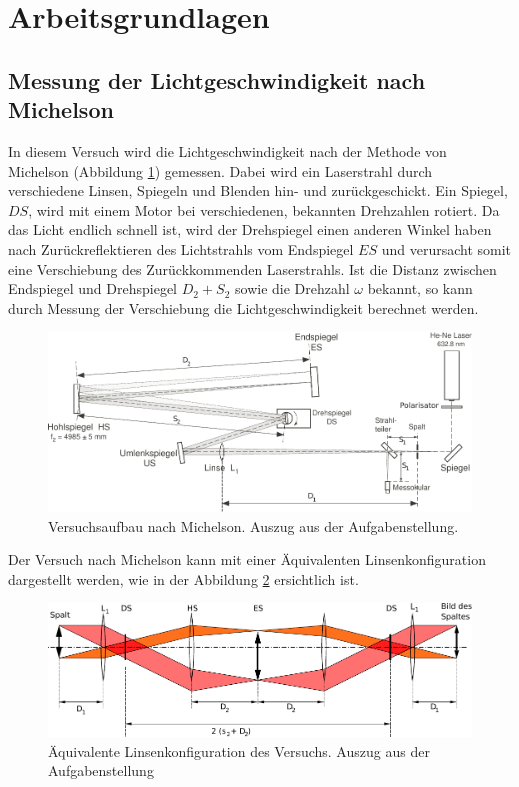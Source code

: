 \section{Arbeitsgrundlagen}

\subsection{Messung der Lichtgeschwindigkeit nach Michelson}

In diesem Versuch wird die  Lichtgeschwindigkeit  nach der Methode von Michelson
(Abbildung  \ref{fig:michelson})  gemessen. Dabei  wird  ein  Laserstrahl  durch
verschiedene  Linsen,  Spiegeln  und Blenden  hin-  und  zur\"uckgeschickt.  Ein
Spiegel,  $DS$, wird mit einem Motor  bei  verschiedenen,  bekannten  Drehzahlen
rotiert. Da das Licht endlich  schnell  ist,  wird der Drehspiegel einen anderen
Winkel haben nach Zur\"uckreflektieren des Lichtstrahls  vom Endspiegel $ES$ und
verursacht somit  eine  Verschiebung des Zur\"uckkommenden Laserstrahls. Ist die
Distanz  zwischen Endspiegel und Drehspiegel $D_2  +  S_2$  sowie  die  Drehzahl
$\omega$   bekannt,   so   kann   durch    Messung    der    Verschiebung    die
Lichtgeschwindigkeit berechnet werden.

\begin{figure}[H]
    \center
    \includegraphics[width=\textwidth]{images/michelson.pdf}
    \caption{Versuchsaufbau nach Michelson. Auszug aus der Aufgabenstellung.}
    \label{fig:michelson}
\end{figure}

Der  Versuch  nach  Michelson kann mit einer \"Aquivalenten  Linsenkonfiguration
dargestellt werden, wie in der Abbildung \ref{fig:linsenkonfig} ersichtlich ist.

\begin{figure}[H]
    \center
    \includegraphics[width=\textwidth]{images/linsenkonfig.pdf}
    \caption{\"Aquivalente Linsenkonfiguration des Versuchs. Auszug aus der Aufgabenstellung}
    \label{fig:linsenkonfig}
\end{figure}

